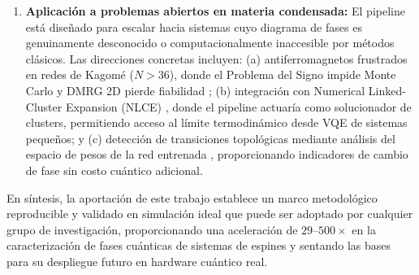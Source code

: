\documentclass[11pt,a4paper,spanish]{book}
\begin{document}
\begin{enumerate}
    \item \textbf{Aplicación a problemas abiertos en materia condensada:} El pipeline está diseñado para escalar hacia sistemas cuyo diagrama de fases es genuinamente desconocido o computacionalmente inaccesible por métodos clásicos. Las direcciones concretas incluyen: (a) antiferromagnetos frustrados en redes de Kagomé ($N > 36$), donde el Problema del Signo impide Monte Carlo y DMRG 2D pierde fiabilidad \citep{troyer2005, ahsan2025}; (b) integración con Numerical Linked-Cluster Expansion (NLCE) \citep{sumeet2025}, donde el pipeline actuaría como solucionador de clusters, permitiendo acceso al límite termodinámico desde VQE de sistemas pequeños; y (c) detección de transiciones topológicas mediante análisis del espacio de pesos de la red entrenada \citep{hernandes2025}, proporcionando indicadores de cambio de fase sin costo cuántico adicional.
\end{enumerate}

En síntesis, la aportación de este trabajo establece un marco metodológico reproducible y validado en simulación ideal que puede ser adoptado por cualquier grupo de investigación, proporcionando una aceleración de $29$--$500\times$ en la caracterización de fases cuánticas de sistemas de espines y sentando las bases para su despliegue futuro en hardware cuántico real.


\end{document}
